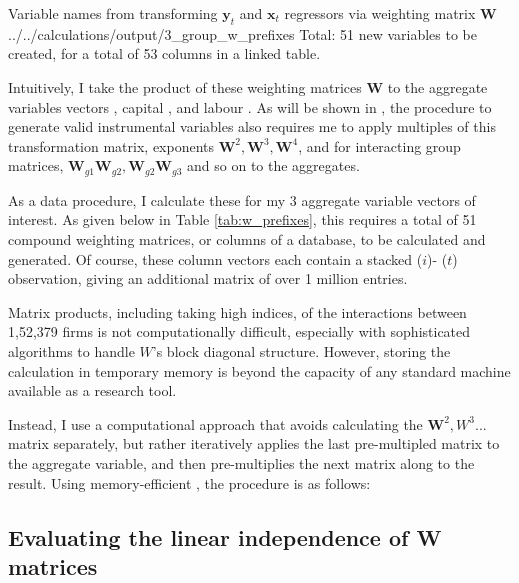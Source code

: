 \wraptable
    {Variable names from transforming $\mathbf y_t$ and $\mathbf x_t$ regressors via weighting matrix $\mathbf W$} 
    {../../calculations/output/3_group_w_prefixes}
    {Total: 51 new variables to be created, for a total of 53 columns in a linked table.}

Intuitively, I take the product of these weighting matrices $\mathbf W$ to the aggregate variables vectors
, capital , and labour .
As will be shown in , the procedure to generate valid instrumental variables
also requires me to apply multiples of this transformation matrix,
exponents $\mathbf W^2, \mathbf W^3, \mathbf W^4$, and for interacting group matrices,
$\mathbf W_{g1}\mathbf W_{g2}, \mathbf W_{g2}\mathbf W_{g3}$ and so on to the aggregates.
\par
As a data procedure, I calculate these for my 3 aggregate variable vectors of interest.
As given below in Table \ref{tab:w_prefixes}, this requires a total of 51 compound weighting matrices,
or columns of a database, to be calculated and generated.
Of course, these column vectors each contain a stacked  ($i$)- ($t$)
observation, giving an additional matrix of over 1 million entries.

Matrix products, including taking high indices, of the interactions between 1,52,379 firms
is not computationally difficult, especially with sophisticated algorithms to handle $W$'s block diagonal structure.
However, storing the calculation in temporary memory is beyond
the capacity of any standard machine available as a research tool.
\par
Instead, I use a computational approach that avoids calculating the $\mathbf W^2, W^3...$ matrix
separately, but rather iteratively applies the last pre-multipled matrix to the aggregate variable,
and then pre-multiplies the next matrix along to the result.
Using memory-efficient , the procedure is as follows:

\subsection{Evaluating the linear independence of W matrices}

